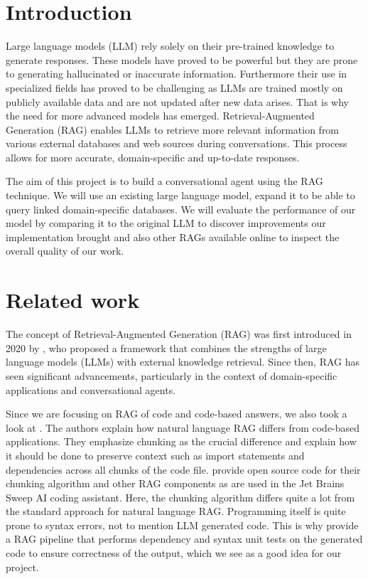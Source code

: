 \documentclass[fleqn,moreauthors,10pt]{ds_report}
\affiliation{\textit{Advisors: Aleš Žagar}}
\begin{document}
\flushbottom 

\maketitle 

\thispagestyle{empty} 

\section*{Introduction}
Large language models (LLM) rely solely on their pre-trained knowledge to generate responses. 
These models have proved to be powerful but they are prone to generating hallucinated or inaccurate information. 
Furthermore their use in specialized fields has proved to be challenging as LLMs are trained mostly on publicly available 
data and are not updated after new data arises. That is why the need for more advanced models has emerged. Retrieval-Augmented Generation (RAG) enables LLMs to 
retrieve more relevant information from various external databases and web sources during conversations. 
This process allows for more accurate, domain-specific and up-to-date responses.

The aim of this project is to build a conversational agent using the RAG technique. We will use an existing large language model, 
expand it to be able to query linked domain-specific databases. We will evaluate 
the performance of our model by comparing it to the original LLM to discover improvements our implementation brought and also other RAGs available online to inspect the overall quality of our work.


\section*{Related work}
The concept of Retrieval-Augmented Generation (RAG) was first introduced in 2020 by \cite{NEURIPS2020_6b493230}, who proposed a framework that combines the strengths of large language models (LLMs) with external knowledge retrieval. Since then, RAG has seen significant advancements, particularly in the context of domain-specific applications and conversational agents.

Since we are focusing on RAG of code and code-based answers, we also took a look at \cite{large_codebaseRAG}. The authors explain how natural language RAG differs from code-based applications. They emphasize chunking as the crucial difference and explain how it should be done to preserve context such as import statements and dependencies across all chunks of the code file. \cite{sweepai} provide open source code for their chunking algorithm and other RAG components as are used in the Jet Brains Sweep AI coding assistant. Here, the chunking algorithm differs quite a lot from the standard approach for natural language RAG. Programming itself is quite prone to syntax errors, not to mention LLM generated code. This is why \cite{self-correction} provide a RAG pipeline that performs dependency and syntax unit tests on the generated code to ensure correctness of the output, which we see as a good idea for our project.
\end{document}
